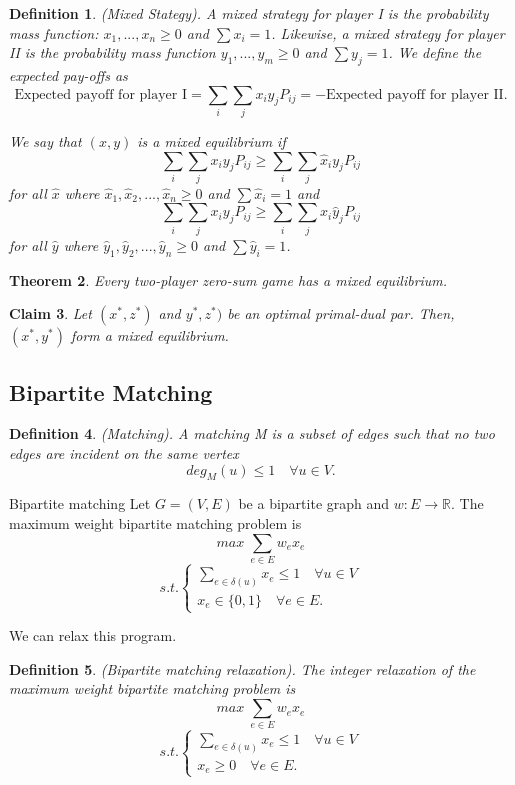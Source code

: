\documentclass[twoside]{article}
\newcounter{lecnum}
\newtheorem{theorem}{Theorem}[lecnum]
\newtheorem{claim}[theorem]{Claim}
\newtheorem{definition}[theorem]{Definition}
\begin{document}
\begin{definition}(Mixed Stategy). A mixed strategy for player I is the probability mass function: $x_1,...,x_n \geq 0$ and $\sum x_i = 1$. Likewise, a mixed strategy for player II is the probability mass function $y_1,...,y_m \geq 0$ and $\sum y_j = 1$. We define the expected pay-offs as 
$$
\text{Expected payoff for player I} = \sum_{i}\sum_jx_iy_jP_{ij} = -\text{Expected payoff for player II}.
$$

We say that $(x,y)$ is a mixed equilibrium if 
$$
\sum_i\sum_jx_iy_jP_{ij} \geq \sum_i\sum_j\hat{x}_iy_jP_{ij}
$$
for all $\hat{x}$ where $\hat{x}_1,\hat{x}_2,...,\hat{x}_n \geq 0$ and $\sum \hat{x}_i=1$ and 
$$
\sum_i\sum_jx_iy_jP_{ij} \geq \sum_i\sum_jx_i\hat{y}_jP_{ij}
$$
for all $\hat{y}$ where $\hat{y}_1,\hat{y}_2,...,\hat{y}_n \geq 0$ and $\sum \hat{y}_i=1$.
\end{definition}

\begin{theorem}Every two-player zero-sum game has a mixed equilibrium.
\end{theorem}

\begin{claim}Let $(x^*,z^*)$ and $y^*,z^*)$ be an optimal primal-dual par. Then, $(x^*,y^*)$ form a mixed equilibrium.
\end{claim}

\subsection{Bipartite Matching}
\begin{definition}(Matching). A matching M is a subset of edges such that no two edges are incident on the same vertex 
$$
deg_M(u) \leq 1 \quad \forall u \in V.
$$
\end{definition}

\begin{definition_exam}{Bipartite matching}{} Let $G = (V,E)$ be a bipartite graph and $w: E \rightarrow \mathbb{R}.$ The maximum weight bipartite matching problem is 
$$
max \; \sum_{e \in E}w_ex_e
$$
$$
s.t. 
\begin{cases}
\sum_{e \in \delta(u)}x_e \leq 1 \quad \forall u \in V\\
x_e \in \{0,1\} \quad \forall e \in E.
\end{cases}
$$
\end{definition_exam}

We can relax this program.


\begin{definition}(Bipartite matching relaxation). The integer relaxation of the maximum weight bipartite matching problem is 
$$
max \; \sum_{e \in E}w_ex_e
$$
$$
s.t. 
\begin{cases}
\sum_{e \in \delta(u)}x_e \leq 1 \quad \forall u \in V\\
x_e \geq 0 \quad \forall e \in E.
\end{cases}
$$
\end{definition}
\end{document}
